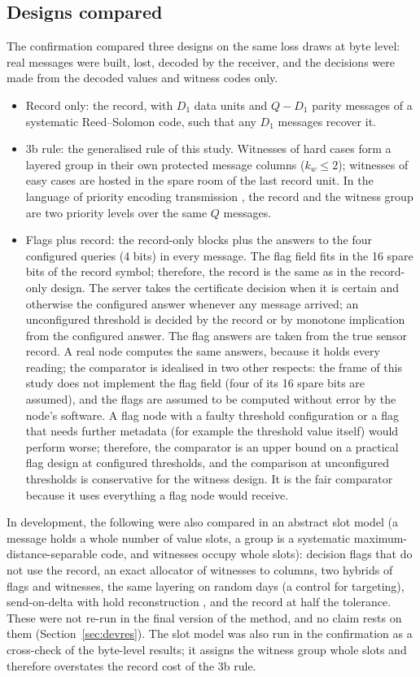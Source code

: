 \subsection{Designs compared}
\label{sec:designs}
The confirmation compared three designs on the same loss draws at byte level: real messages were built, lost, decoded by the receiver, and the decisions were made from the decoded values and witness codes only.
\begin{itemize}
  \item Record only: the record, with $D_1$ data units and $Q - D_1$ parity messages of a systematic Reed--Solomon code, such that any $D_1$ messages recover it.
  \item 3b rule: the generalised rule of this study. Witnesses of hard cases form a layered group in their own protected message columns ($k_w \le 2$); witnesses of easy cases are hosted in the spare room of the last record unit. In the language of priority encoding transmission \citep{albanese1996}, the record and the witness group are two priority levels over the same $Q$ messages.
  \item Flags plus record: the record-only blocks plus the answers to the four configured queries (4 bits) in every message. The flag field fits in the 16 spare bits of the record symbol; therefore, the record is the same as in the record-only design. The server takes the certificate decision when it is certain and otherwise the configured answer whenever any message arrived; an unconfigured threshold is decided by the record or by monotone implication from the configured answer. The flag answers are taken from the true sensor record. A real node computes the same answers, because it holds every reading; the comparator is idealised in two other respects: the frame of this study does not implement the flag field (four of its 16 spare bits are assumed), and the flags are assumed to be computed without error by the node's software. A flag node with a faulty threshold configuration or a flag that needs further metadata (for example the threshold value itself) would perform worse; therefore, the comparator is an upper bound on a practical flag design at configured thresholds, and the comparison at unconfigured thresholds is conservative for the witness design. It is the fair comparator because it uses everything a flag node would receive.
\end{itemize}
In development, the following were also compared in an abstract slot model (a message holds a whole number of value slots, a group is a systematic maximum-distance-separable code, and witnesses occupy whole slots): decision flags that do not use the record, an exact allocator of witnesses to columns, two hybrids of flags and witnesses, the same layering on random days (a control for targeting), send-on-delta with hold reconstruction \citep{diazcacho2017sod}, and the record at half the tolerance. These were not re-run in the final version of the method, and no claim rests on them (Section~\ref{sec:devres}). The slot model was also run in the confirmation as a cross-check of the byte-level results; it assigns the witness group whole slots and therefore overstates the record cost of the 3b rule.
